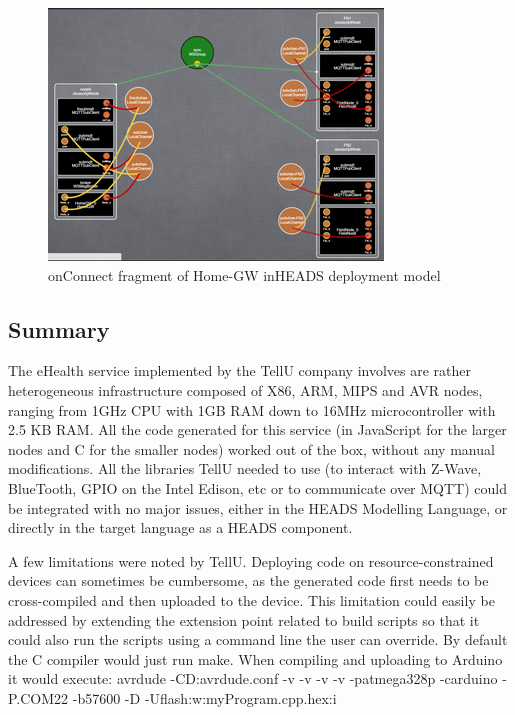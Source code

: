 \begin{figure}[h]
	\centering
	\includegraphics[width=1\linewidth]{figures/fig8}
	\caption{onConnect fragment of Home-GW inHEADS deployment model}
	\label{fig:fig8}
\end{figure}

\subsection{Summary}
The eHealth service implemented by the TellU company involves are rather heterogeneous infrastructure composed of X86, ARM, MIPS and AVR nodes, ranging from 1GHz CPU with 1GB RAM down to 16MHz microcontroller with 2.5 KB RAM. All the code generated for this service (in JavaScript for the larger nodes and C for the smaller nodes) worked out of the box, without any manual modifications. All the libraries TellU needed to use (to interact with Z-Wave, BlueTooth, GPIO on the Intel Edison, etc or to communicate over MQTT) could be integrated with no major issues, either in the HEADS Modelling Language, or directly in the target language as a HEADS component.  

A few limitations were noted by TellU. Deploying code on resource-constrained devices can sometimes be cumbersome, as the generated code first needs to be cross-compiled and then uploaded to the device. This limitation could easily be addressed by extending the extension point related to build scripts so that it could also run the scripts using a command line the user can override. By default the C compiler would just run make. When compiling and uploading to Arduino it would execute: avrdude -CD:avrdude.conf -v -v -v -v -patmega328p -carduino -P.COM22 -b57600 -D -Uflash:w:myProgram.cpp.hex:i 

